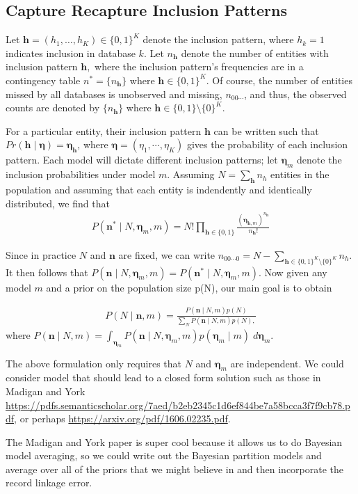 \documentclass[twoside]{article}
\newcommand{\n}{\boldsymbol{n}}
\newcommand{\h}{\boldsymbol{h}}
\newcommand{\boeta}{\boldsymbol{\eta}}
\begin{document}
\subsection{Capture Recapture Inclusion Patterns} 
Let $\h =(h_1,\ldots,h_K) \in \{0,1\}^K$ denote the inclusion pattern, where $h_k=1$ indicates inclusion in database $k.$ Let $n_{\h}$ denote the number of entities with inclusion pattern $\h,$ where the inclusion pattern's frequencies are in a contingency table $n^* = \{n_{\h} \}$ where $\h \in \{0,1\}^K.$ Of course, the number of entities missed by all databases is unobserved and missing, $n_{00\cdots}$, and thus, the observed counts are denoted by $\{n_{\h} \}$ where $\h \in \{0,1\} \setminus \{0\}^K.$

For a particular entity, their inclusion pattern $\h$ can be written such that $Pr(\h \mid \boeta) = \boeta_{\h}$, where $\boeta = (\eta_1, \cdots, \eta_K)$ gives the probability of each inclusion pattern. Each model will dictate different inclusion patterns; let $\boeta_m$ denote the inclusion probabilities under model $m.$ Assuming $N = \sum_{\h} n_{h}$ entities in the population and assuming that each entity is indendently and identically distributed, we find that 
\begin{align}
P(\n^{*} \mid N, \boeta_m, m) = N! \prod_{\h \in \{0,1\}} 
\frac{
(\boeta_{\h,m})^{n_{\h}}}
{n_{\h}!}
\end{align}

Since in practice $N$ and $\n$ are fixed, we can write $n_{00\cdots0} = N - \sum_{\h \in  \{0,1\}^K \setminus \{0\}^K} n_{h}$. It then follows that 
$P(\n \mid N, \boeta_m, m) = P(\n^{*} \mid N, \boeta_m, m).$ Now given any model $m$ and a prior on the population size p(N), our main goal is to obtain

\begin{align}
P(N \mid \n, m) = \frac{
P(\n \mid N, m) p(N)
}
{
\sum_N P(\n \mid N, m) p(N),
}
\end{align}
where 
$
P(\n \mid N, m) = \int_{\boeta_m} 
P(\n \mid N, \boeta_m, m) p(\boeta_m \mid m) \; d \boeta_m.
$

The above formulation only requires that $N$ and $\boeta_m$ are independent. We could consider model that should lead to a closed form solution such as those in Madigan and York \url{https://pdfs.semanticscholar.org/7aed/b2eb2345c1d6ef844be7a58bcca3f7f9cb78.pdf}, or perhaps \url{https://arxiv.org/pdf/1606.02235.pdf}. 

The Madigan and York paper is super cool because it allows us to do Bayesian model averaging, so we could write out the Bayesian partition models and average over all of the priors that we might believe in and then incorporate the record linkage error. 
\end{document}
